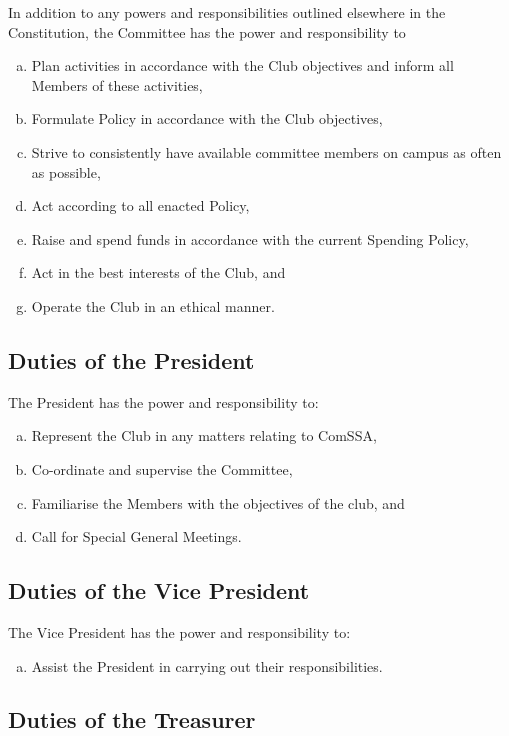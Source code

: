 \documentclass[a4paper,12pt]{article}
\begin{document}
In addition to any powers and responsibilities outlined elsewhere in the Constitution, the Committee has the power and responsibility to

\begin{enumerate}[a)]
	\item Plan activities in accordance with the Club objectives and inform all Members of these activities,
	\item Formulate Policy in accordance with the Club objectives,
	\item Strive to consistently have available committee members on campus as often as possible,
	\item Act according to all enacted Policy,
	\item Raise and spend funds in accordance with the current Spending Policy,
	\item Act in the best interests of the Club, and
	\item Operate the Club in an ethical manner.
\end{enumerate}

\subsection{Duties of the President}

The President has the power and responsibility to:

\begin{enumerate}[a)]
	\item Represent the Club in any matters relating to ComSSA,
	\item Co-ordinate and supervise the Committee,
	\item Familiarise the Members with the objectives of the club, and
	\item Call for Special General Meetings.
\end{enumerate}

\subsection{Duties of the Vice President}

The Vice President has the power and responsibility to:

\begin{enumerate}[a)]
	\item Assist the President in carrying out their responsibilities.
\end{enumerate}

\subsection{Duties of the Treasurer}
\end{document}
